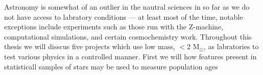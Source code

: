 Astronomy is somewhat of an outlier in the nautral sciences in so far as we do
not have access to labratory conditions --- at least most of the time, notable
exceptions include experiments such as those run with the Z-machine,
computational simulations, and certain cosmochemistry work. Throughout this
thesis we will disscus five projects which use low mass, $< 2$ M$_{\odot}$, as
labratories to test various physics in a controlled manner. First we will how
features present in statisticall samples of stars may be used to measure
population ages 
